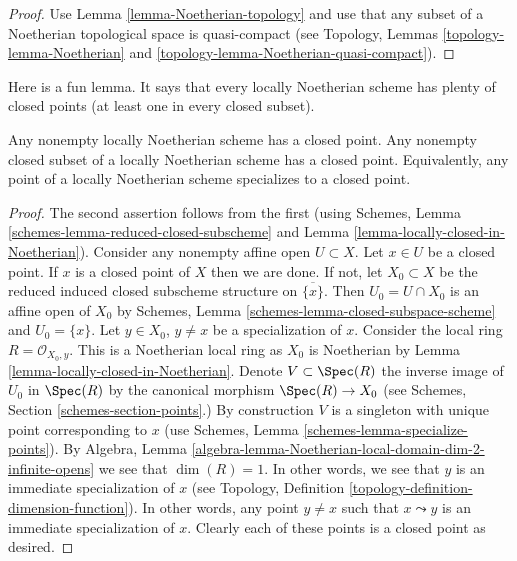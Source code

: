 \begin{proof}
Use Lemma \ref{lemma-Noetherian-topology}
and use that any subset of a Noetherian topological
space is quasi-compact (see Topology,
Lemmas \ref{topology-lemma-Noetherian} and
\ref{topology-lemma-Noetherian-quasi-compact}).
\end{proof}

\noindent
Here is a fun lemma.
It says that every locally Noetherian scheme has plenty of
closed points (at least one in every closed subset).

\begin{lemma}
\label{lemma-locally-Noetherian-closed-point}
Any nonempty locally Noetherian scheme has a closed point.
Any nonempty closed subset of a locally Noetherian scheme has a closed point.
Equivalently, any point of a locally Noetherian scheme specializes
to a closed point.
\end{lemma}

\begin{proof}
The second assertion follows from the first (using
Schemes, Lemma \ref{schemes-lemma-reduced-closed-subscheme}
and Lemma \ref{lemma-locally-closed-in-Noetherian}).
Consider any nonempty affine open $U \subset X$.
Let $x \in U$ be a closed point. If $x$ is a closed point
of $X$ then we are done. If not, let $X_0 \subset X$ be the
reduced induced closed subscheme structure on $\overline{\{x\}}$.
Then $U_0 = U \cap X_0$ is an affine open of $X_0$ by
Schemes, Lemma \ref{schemes-lemma-closed-subspace-scheme} and
$U_0 = \{x\}$. Let $y \in X_0$, $y \not = x$ be a specialization of $x$.
Consider the local ring $R = \mathcal{O}_{X_0, y}$.
This is a Noetherian local ring as $X_0$ is Noetherian
by Lemma \ref{lemma-locally-closed-in-Noetherian}. Denote $V \subset \Spec(R)$
the inverse image of $U_0$ in $\Spec(R)$ by the canonical morphism
$\Spec(R) \to X_0$ (see Schemes, Section \ref{schemes-section-points}.)
By construction $V$ is a singleton with unique point corresponding to $x$ (use
Schemes, Lemma \ref{schemes-lemma-specialize-points}).
By
Algebra, Lemma \ref{algebra-lemma-Noetherian-local-domain-dim-2-infinite-opens}
we see that $\dim(R) = 1$.
In other words, we see that $y$ is an immediate specialization
of $x$ (see Topology, Definition \ref{topology-definition-dimension-function}).
In other words, any
point $y \not = x$ such that $x \leadsto y$ is an immediate
specialization of $x$. Clearly each of these points is a
closed point as desired.
\end{proof}

